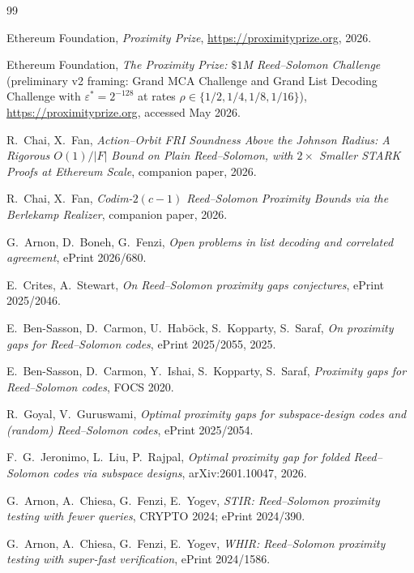 \documentclass[11pt]{article}
\begin{document}
\begin{thebibliography}{99}

 Ethereum Foundation, \emph{Proximity Prize}, \url{https://proximityprize.org}, 2026.

 Ethereum Foundation, \emph{The Proximity Prize: $\$1$M Reed--Solomon Challenge} (preliminary v2 framing: Grand MCA Challenge and Grand List Decoding Challenge with $\varepsilon^* = 2^{-128}$ at rates $\rho \in \{1/2, 1/4, 1/8, 1/16\}$), \url{https://proximityprize.org}, accessed May 2026.

 R.~Chai, X.~Fan, \emph{Action--Orbit FRI Soundness Above the Johnson Radius: A Rigorous $O(1)/|F|$ Bound on Plain Reed--Solomon, with $2{\times}$ Smaller STARK Proofs at Ethereum Scale}, companion paper, 2026.

 R.~Chai, X.~Fan, \emph{Codim-$2(c{-}1)$ Reed--Solomon Proximity Bounds via the Berlekamp Realizer}, companion paper, 2026.

 G.~Arnon, D.~Boneh, G.~Fenzi, \emph{Open problems in list decoding and correlated agreement}, ePrint 2026/680.

 E.~Crites, A.~Stewart, \emph{On Reed--Solomon proximity gaps conjectures}, ePrint 2025/2046.

 E.~Ben-Sasson, D.~Carmon, U.~Hab\"{o}ck, S.~Kopparty, S.~Saraf, \emph{On proximity gaps for Reed--Solomon codes}, ePrint 2025/2055, 2025.

 E.~Ben-Sasson, D.~Carmon, Y.~Ishai, S.~Kopparty, S.~Saraf, \emph{Proximity gaps for Reed--Solomon codes}, FOCS 2020.

 R.~Goyal, V.~Guruswami, \emph{Optimal proximity gaps for subspace-design codes and (random) Reed--Solomon codes}, ePrint 2025/2054.

 F.~G.~Jeronimo, L.~Liu, P.~Rajpal, \emph{Optimal proximity gap for folded Reed--Solomon codes via subspace designs}, arXiv:2601.10047, 2026.

 G.~Arnon, A.~Chiesa, G.~Fenzi, E.~Yogev, \emph{STIR: Reed--Solomon proximity testing with fewer queries}, CRYPTO 2024; ePrint 2024/390.

 G.~Arnon, A.~Chiesa, G.~Fenzi, E.~Yogev, \emph{WHIR: Reed--Solomon proximity testing with super-fast verification}, ePrint 2024/1586.


\end{thebibliography}
\end{document}
